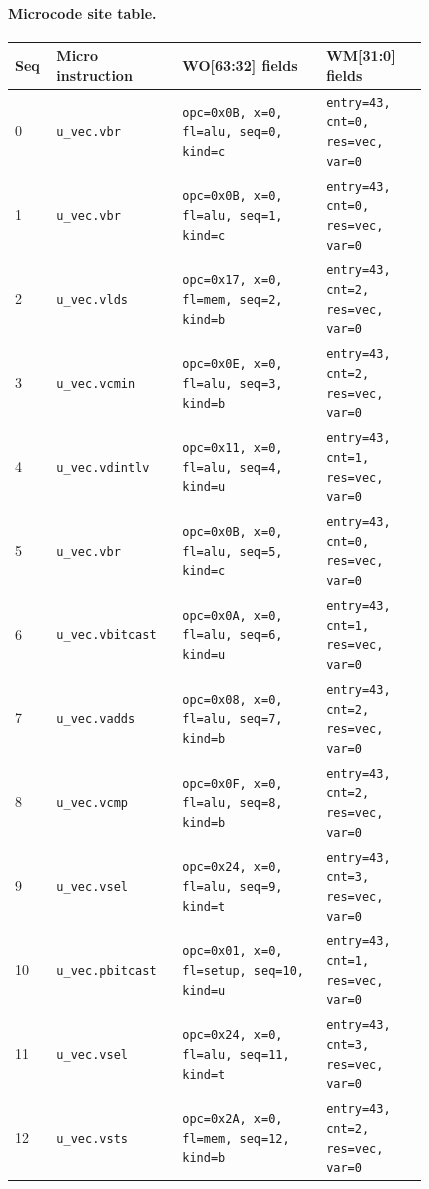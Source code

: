 \paragraph{Microcode site table.}
{\scriptsize
\begin{longtable}{@{}R{0.055\linewidth}L{0.23\linewidth}L{0.31\linewidth}L{0.22\linewidth}@{}}
\toprule
Seq & Micro instruction & WO[63:32] fields & WM[31:0] fields \\
 & \texttt{u\_vec.vbr} & \texttt{opc=0x0B, x=0, fl=alu, seq=0, kind=c} & \texttt{entry=43, cnt=0, res=vec, var=0} \\
1 & \texttt{u\_vec.vbr} & \texttt{opc=0x0B, x=0, fl=alu, seq=1, kind=c} & \texttt{entry=43, cnt=0, res=vec, var=0} \\
2 & \texttt{u\_vec.vlds} & \texttt{opc=0x17, x=0, fl=mem, seq=2, kind=b} & \texttt{entry=43, cnt=2, res=vec, var=0} \\
3 & \texttt{u\_vec.vcmin} & \texttt{opc=0x0E, x=0, fl=alu, seq=3, kind=b} & \texttt{entry=43, cnt=2, res=vec, var=0} \\
4 & \texttt{u\_vec.vdintlv} & \texttt{opc=0x11, x=0, fl=alu, seq=4, kind=u} & \texttt{entry=43, cnt=1, res=vec, var=0} \\
5 & \texttt{u\_vec.vbr} & \texttt{opc=0x0B, x=0, fl=alu, seq=5, kind=c} & \texttt{entry=43, cnt=0, res=vec, var=0} \\
6 & \texttt{u\_vec.vbitcast} & \texttt{opc=0x0A, x=0, fl=alu, seq=6, kind=u} & \texttt{entry=43, cnt=1, res=vec, var=0} \\
7 & \texttt{u\_vec.vadds} & \texttt{opc=0x08, x=0, fl=alu, seq=7, kind=b} & \texttt{entry=43, cnt=2, res=vec, var=0} \\
8 & \texttt{u\_vec.vcmp} & \texttt{opc=0x0F, x=0, fl=alu, seq=8, kind=b} & \texttt{entry=43, cnt=2, res=vec, var=0} \\
9 & \texttt{u\_vec.vsel} & \texttt{opc=0x24, x=0, fl=alu, seq=9, kind=t} & \texttt{entry=43, cnt=3, res=vec, var=0} \\
10 & \texttt{u\_vec.pbitcast} & \texttt{opc=0x01, x=0, fl=setup, seq=10, kind=u} & \texttt{entry=43, cnt=1, res=vec, var=0} \\
11 & \texttt{u\_vec.vsel} & \texttt{opc=0x24, x=0, fl=alu, seq=11, kind=t} & \texttt{entry=43, cnt=3, res=vec, var=0} \\
12 & \texttt{u\_vec.vsts} & \texttt{opc=0x2A, x=0, fl=mem, seq=12, kind=b} & \texttt{entry=43, cnt=2, res=vec, var=0} \\
\bottomrule
\end{longtable}
}
